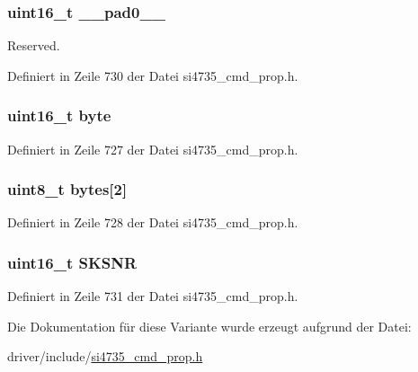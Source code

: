 \subsubsection[{\+\_\+\+\_\+pad0\+\_\+\+\_\+}]{\setlength{\rightskip}{0pt plus 5cm}uint16\+\_\+t \+\_\+\+\_\+pad0\+\_\+\+\_\+}\label{unionfm__seek__tune__snr__thres_a77132c2c26a75f5b8751b235cda23828}


Reserved. 



Definiert in Zeile 730 der Datei si4735\+\_\+cmd\+\_\+prop.\+h.

\hypertarget{unionfm__seek__tune__snr__thres_ab0549c1b5ea980a02e7eab77e21fea49}{}
\subsubsection[{byte}]{\setlength{\rightskip}{0pt plus 5cm}uint16\+\_\+t byte}\label{unionfm__seek__tune__snr__thres_ab0549c1b5ea980a02e7eab77e21fea49}


Definiert in Zeile 727 der Datei si4735\+\_\+cmd\+\_\+prop.\+h.

\hypertarget{unionfm__seek__tune__snr__thres_a46e4c05d20a047ec169f60d3167e912e}{}
\subsubsection[{bytes}]{\setlength{\rightskip}{0pt plus 5cm}uint8\+\_\+t bytes\mbox{[}2\mbox{]}}\label{unionfm__seek__tune__snr__thres_a46e4c05d20a047ec169f60d3167e912e}


Definiert in Zeile 728 der Datei si4735\+\_\+cmd\+\_\+prop.\+h.

\hypertarget{unionfm__seek__tune__snr__thres_aa9c8e1fe1b7fa73e35c29242c74fc247}{}
\subsubsection[{S\+K\+S\+N\+R}]{\setlength{\rightskip}{0pt plus 5cm}uint16\+\_\+t S\+K\+S\+N\+R}\label{unionfm__seek__tune__snr__thres_aa9c8e1fe1b7fa73e35c29242c74fc247}


Definiert in Zeile 731 der Datei si4735\+\_\+cmd\+\_\+prop.\+h.



Die Dokumentation für diese Variante wurde erzeugt aufgrund der Datei\+:\begin{DoxyCompactItemize}
\item 
driver/include/\hyperlink{si4735__cmd__prop_8h}{si4735\+\_\+cmd\+\_\+prop.\+h}\end{DoxyCompactItemize}

